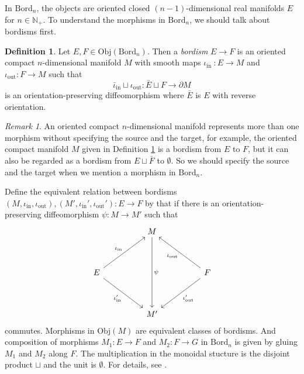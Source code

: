 \documentclass[10pt,reqno,final]{article}
\numberwithin{equation}{section}
\numberwithin{figure}{section}
\numberwithin{table}{section}
\theoremstyle{plain}
\theoremstyle{definition}
\newtheorem{definition}[theorem]{Definition}
\theoremstyle{remark}
\newtheorem{remark}{Remark}[theorem]
\begin{document}
    In \(\mathrm{Bord}_{n}\), the objects are oriented closed \((n-1)\)-dimensional real manifolds \(E \) for \(n\in \mathbb{N}_{+}\). To understand the morphisms in \(\mathrm{Bord}_{n}\), we should talk about bordisms first.
    \begin{definition}\label{def:bordism}
      Let \(E,F\in \mathrm{Obj}(\mathrm{Bord}_{n})\). Then a \emph{bordism} \(E\to F \) is an oriented compact \(n\)-dimensional manifold \(M\) with smooth maps \(\iota_{\text{in }}:E\to M\) and \(\iota_{\text{out}}:F\to M\) such that 
      \begin{equation}\label{eq:bordism}
        \bar{\iota}_{\text{in}}\sqcup \iota_{\text{out}}:\bar{E}\sqcup F\to \partial M
      \end{equation}
      is an orientation-preserving diffeomorphism where \(\bar{E}\) is \(E\) with reverse orientation. 
    \end{definition}
    \begin{remark}
      An oriented compact \(n\)-dimensional manifold represents more than one morphism without specifying the source and the target, for example, the oriented compact manifold \(M\) given in Definition \ref{def:bordism} is a bordism from \(E\) to \(F\), but it can also be regarded as a bordism from \(E\sqcup \bar{F}\) to \(\emptyset\). So we should specify the source and the target when we mention a morphism in \(\mathrm{Bord}_{n}\).
    \end{remark}
    Define the equivalent relation between bordisms \((M,\iota_{\text{in}},\iota_{\text{out}}),(M',\iota_{\text{in}}',\iota_{\text{out}}'):E\to F\) by that if there is an orientation-preserving diffeomorphism \(\psi:M\to M'\) such that 
    \begin{equation}
        \begin{tikzcd}
            && M \\
            \\
            E &&&& {F} \\
            \\
            && {M'}
            \arrow["\psi", from=1-3, to=5-3]
            \arrow["{\iota_{\text{in}}}", from=3-1, to=1-3]
            \arrow["{\iota_{\text{in}}'}"', from=3-1, to=5-3]
            \arrow["{\iota_{\text{out}}}", from=3-5, to=1-3]
            \arrow["{\iota_{\text{out}}'}", from=3-5, to=5-3]
        \end{tikzcd}
    \end{equation}
    commutes.
    Morphisms in \(\mathrm{Obj}(M)\) are equivalent classes of bordisms. And composition of morphisms \(M_1:E\to F \) and \(M_2:F\to G\) in \(\mathrm{Bord}_{n}\) is given by gluing \(M_1\) and \(M_2\) along \(F\). The multiplication in the monoidal stucture is the disjoint product \(\sqcup\) and the unit is \(\emptyset\). For details, see \cite{kockFrobeniusAlgebras2d2004}. 
\end{document}
